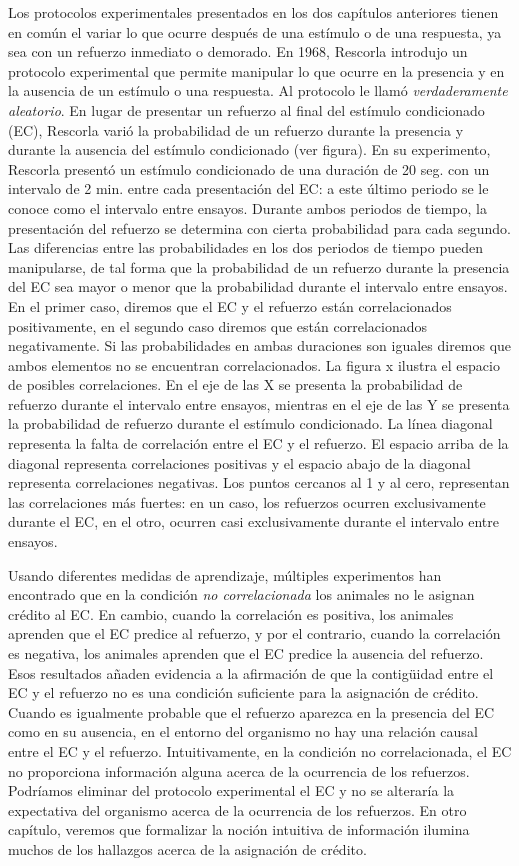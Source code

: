 \documentclass[
  letterpaper,
]{book}
\begin{document}
Los protocolos experimentales presentados en los dos capítulos
anteriores tienen en común el variar lo que ocurre después de una
estímulo o de una respuesta, ya sea con un refuerzo inmediato o
demorado. En 1968, Rescorla introdujo un protocolo experimental que
permite manipular lo que ocurre en la presencia y en la ausencia de un
estímulo o una respuesta. Al protocolo le llamó \emph{verdaderamente
aleatorio}. En lugar de presentar un refuerzo al final del estímulo
condicionado (EC), Rescorla varió la probabilidad de un refuerzo durante
la presencia y durante la ausencia del estímulo condicionado (ver
figura). En su experimento, Rescorla presentó un estímulo condicionado
de una duración de 20 seg. con un intervalo de 2 min. entre cada
presentación del EC: a este último periodo se le conoce como el
intervalo entre ensayos. Durante ambos periodos de tiempo, la
presentación del refuerzo se determina con cierta probabilidad para cada
segundo. Las diferencias entre las probabilidades en los dos periodos de
tiempo pueden manipularse, de tal forma que la probabilidad de un
refuerzo durante la presencia del EC sea mayor o menor que la
probabilidad durante el intervalo entre ensayos. En el primer caso,
diremos que el EC y el refuerzo están correlacionados positivamente, en
el segundo caso diremos que están correlacionados negativamente. Si las
probabilidades en ambas duraciones son iguales diremos que ambos
elementos no se encuentran correlacionados. La figura x ilustra el
espacio de posibles correlaciones. En el eje de las X se presenta la
probabilidad de refuerzo durante el intervalo entre ensayos, mientras en
el eje de las Y se presenta la probabilidad de refuerzo durante el
estímulo condicionado. La línea diagonal representa la falta de
correlación entre el EC y el refuerzo. El espacio arriba de la diagonal
representa correlaciones positivas y el espacio abajo de la diagonal
representa correlaciones negativas. Los puntos cercanos al 1 y al cero,
representan las correlaciones más fuertes: en un caso, los refuerzos
ocurren exclusivamente durante el EC, en el otro, ocurren casi
exclusivamente durante el intervalo entre ensayos.

Usando diferentes medidas de aprendizaje, múltiples experimentos han
encontrado que en la condición \emph{no correlacionada} los animales no
le asignan crédito al EC. En cambio, cuando la correlación es positiva,
los animales aprenden que el EC predice al refuerzo, y por el contrario,
cuando la correlación es negativa, los animales aprenden que el EC
predice la ausencia del refuerzo. Esos resultados añaden evidencia a la
afirmación de que la contigüidad entre el EC y el refuerzo no es una
condición suficiente para la asignación de crédito. Cuando es igualmente
probable que el refuerzo aparezca en la presencia del EC como en su
ausencia, en el entorno del organismo no hay una relación causal entre
el EC y el refuerzo. Intuitivamente, en la condición no correlacionada,
el EC no proporciona información alguna acerca de la ocurrencia de los
refuerzos. Podríamos eliminar del protocolo experimental el EC y no se
alteraría la expectativa del organismo acerca de la ocurrencia de los
refuerzos. En otro capítulo, veremos que formalizar la noción intuitiva
de información ilumina muchos de los hallazgos acerca de la asignación
de crédito.
\end{document}
